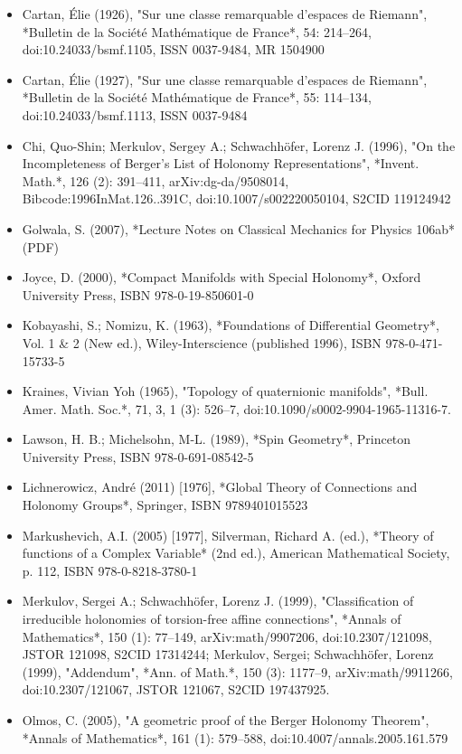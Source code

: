 \begin{itemize}
\item Cartan, Élie (1926), "Sur une classe remarquable d'espaces de Riemann", *Bulletin de la Société Mathématique de France*, 54: 214–264, doi:10.24033/bsmf.1105, ISSN 0037-9484, MR 1504900  
\item Cartan, Élie (1927), "Sur une classe remarquable d'espaces de Riemann", *Bulletin de la Société Mathématique de France*, 55: 114–134, doi:10.24033/bsmf.1113, ISSN 0037-9484  
\item Chi, Quo-Shin; Merkulov, Sergey A.; Schwachhöfer, Lorenz J. (1996), "On the Incompleteness of Berger's List of Holonomy Representations", *Invent. Math.*, 126 (2): 391–411, arXiv:dg-da/9508014, Bibcode:1996InMat.126..391C, doi:10.1007/s002220050104, S2CID 119124942  
\item Golwala, S. (2007), *Lecture Notes on Classical Mechanics for Physics 106ab* (PDF)  
\item Joyce, D. (2000), *Compact Manifolds with Special Holonomy*, Oxford University Press, ISBN 978-0-19-850601-0  
\item Kobayashi, S.; Nomizu, K. (1963), *Foundations of Differential Geometry*, Vol. 1 & 2 (New ed.), Wiley-Interscience (published 1996), ISBN 978-0-471-15733-5  
\item Kraines, Vivian Yoh (1965), "Topology of quaternionic manifolds", *Bull. Amer. Math. Soc.*, 71, 3, 1 (3): 526–7, doi:10.1090/s0002-9904-1965-11316-7.  
\item Lawson, H. B.; Michelsohn, M-L. (1989), *Spin Geometry*, Princeton University Press, ISBN 978-0-691-08542-5  
\item Lichnerowicz, André (2011) [1976], *Global Theory of Connections and Holonomy Groups*, Springer, ISBN 9789401015523  
\item Markushevich, A.I. (2005) [1977], Silverman, Richard A. (ed.), *Theory of functions of a Complex Variable* (2nd ed.), American Mathematical Society, p. 112, ISBN 978-0-8218-3780-1  
\item Merkulov, Sergei A.; Schwachhöfer, Lorenz J. (1999), "Classification of irreducible holonomies of torsion-free affine connections", *Annals of Mathematics*, 150 (1): 77–149, arXiv:math/9907206, doi:10.2307/121098, JSTOR 121098, S2CID 17314244; Merkulov, Sergei; Schwachhöfer, Lorenz (1999), "Addendum", *Ann. of Math.*, 150 (3): 1177–9, arXiv:math/9911266, doi:10.2307/121067, JSTOR 121067, S2CID 197437925.  
\item Olmos, C. (2005), "A geometric proof of the Berger Holonomy Theorem", *Annals of Mathematics*, 161 (1): 579–588, doi:10.4007/annals.2005.161.579

\end{itemize}
